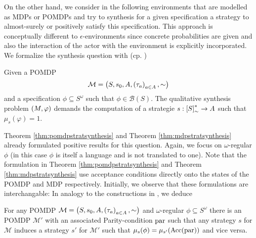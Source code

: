 On the other hand, we consider in the following environments that are modelled
as \acp{MDP} or \acp{POMDP} and try to synthesis for a given specification a
strategy to almost-surely or positively satisfy this specification. This
approach is conceptually different to $\epsilon$-environments since concrete
probabilities are given and also the interaction of the actor with the
environment is explicitly incorporated. We formalize the synthesis question
with (cp. \cite{QualAnaPOMDP,SimpleStochasticParityGames,%
ComplexProbVerification})
\begin{definition}
  Given a \ac{POMDP} 
  \begin{equation*}
    \mathcal{M} = \left(S, s_{0}, A, \left(\tau_{a}\right)_{a\in A}, \sim\right)
  \end{equation*}
  and a specification $\phi\subseteq S^{\omega}$ such that 
  $\phi\in\mathcal{B}(S)$. The qualitative synthesis problem 
  $\left(M, \varphi\right)$ demands the computation of a strategie 
  $s:\left[S\right]_{\sim}^{*}\rightarrow A$ such that $\mu_{s}(\varphi) = 1$.
\end{definition}
Theorem \ref{thm:pomdpstratsynthesis} and Theorem \ref{thm:mdpstratsynthesis}
already formulated positive results for this question. Again, we focus on
$\omega$-regular $\phi$ (in this case $\phi$ is itself a language
and is not translated to one). Note that the formulation in Theorem 
\ref{thm:pomdpstratsynthesis} and Theorem \ref{thm:mdpstratsynthesis} use 
acceptance conditions directly onto the states of the \ac{POMDP} and \ac{MDP}
respectively. Initially, we observe that these formulations are interchangable:
In analogy to the constructions in \cite{ComplexProbVerification,%
MDPandRegEvents}, we deduce
\begin{lemma}
  For any \ac{POMDP} $\mathcal{M} = \left(S, s_{0}, A, 
  \left(\tau_{a}\right)_{a\in A}, \sim\right)$ and $\omega$-regular 
  $\phi\subseteq S^{\omega}$ there is an \ac{POMDP} $\mathcal{M'}$ with an 
  associated Parity-condition $\operatorname{par}$ such that any strategy $s$ for 
  $\mathcal{M}$ induces a strategy $s'$ for $\mathcal{M'}$ such that 
  $\mu_{s}(\phi) = \mu_{s'}(\operatorname{Acc}(\operatorname{par}))$ and vice versa.
  \label{lem:POMDPomegareg}
\end{lemma}
